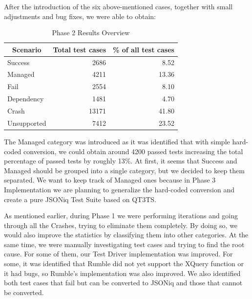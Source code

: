 After the introduction of the six above-mentioned cases, together with small adjustments and bug fixes, we were able to obtain:
\begin{table}[h!]
	\centering
	\begin{tabular}{|l|r|r|}
		\hline
		\multicolumn{1}{|c|}{Scenario} & \multicolumn{1}{c|}{Total test cases} & \multicolumn{1}{c|}{\% of all test cases} \\ \hline
		Success                        & 2686                                  & 8.52                                      \\ \hline
		Managed                        & 4211                                  & 13.36                                     \\ \hline
		Fail                           & 2554                                  & 8.10                                      \\ \hline
		Dependency                     & 1481                                  & 4.70                                      \\ \hline
		Crash                          & 13171                                 & 41.80                                     \\ \hline
		Unsupported                    & 7412                                  & 23.52                                     \\ \hline
	\end{tabular}
	\caption{Phase 2 Results Overview}
	\label{tab:Phase2_ResultTable}
\end{table}

\vspace{-5mm}
The Managed category was introduced as it was identified that with simple hard-coded conversion, we could obtain around 4200 passed tests increasing the total percentage of passed tests by roughly 13\%. At first, it seems that Success and Managed should be grouped into a single category, but we decided to keep them separated. We want to keep track of Managed ones because in Phase 3 Implementation we are planning to generalize the hard-coded conversion and create a pure JSONiq Test Suite based on QT3TS.

As mentioned earlier, during Phase 1 we were performing iterations and going through all the Crashes, trying to eliminate them completely. By doing so, we would also improve the statistics by classifying them into other categories. At the same time, we were manually investigating test cases and trying to find the root cause. For some of them, our Test Driver implementation was improved. For some, it was identified that Rumble did not yet support the XQuery function or it had bugs, so Rumble's implementation was also improved. We also identified both test cases that fail but can be converted to JSONiq and those that cannot be converted.


